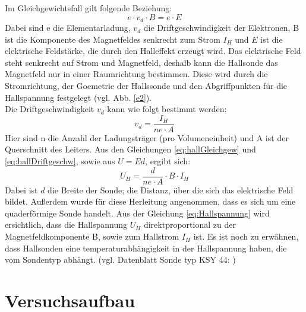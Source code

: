 \documentclass[12pt,a4paper]{article}
\begin{document}
Im Gleichgewichtsfall gilt folgende Beziehung: 
\begin{equation}
	e \cdot v_d\cdot B = e \cdot E
	\label{eq:hallGleichgew}
\end{equation}
Dabei sind e die Elementarladung, $v_d$ die Driftgeschwindigkeit der Elektronen, B ist die Komponente des Magnetfeldes senkrecht zum Strom $I_H$ und $E$ ist die elektrische Feldstärke, die durch den Halleffekt erzeugt wird. Das elektrische Feld steht senkrecht auf Strom und Magnetfeld, deshalb kann die Hallsonde das Magnetfeld nur in einer Raumrichtung bestimmen. Diese wird durch die Stromrichtung, der Goemetrie der Hallssonde und den Abgriffpunkten für die Hallspannung festgelegt (vgl. Abb. \ref{e2}).\\
Die Driftgeschwindigkeit $v_d$ kann  wie folgt bestimmt werden:
\begin{equation} 
	v_d = \frac{I_H}{n e\cdot A}
	\label{eq:hallDriftgeschw}
\end{equation}
Hier sind n die Anzahl der Ladungsträger (pro Volumeneinheit) und A ist der Querschnitt des Leiters. Aus den Gleichungen \ref{eq:hallGleichgew} und \ref{eq:hallDriftgeschw}, sowie aus $U=Ed$, ergibt sich:
\begin{equation}
	U_H = \frac{d}{ne\cdot A} \cdot B \cdot I_H
	\label{eq:Hallspannung}
\end{equation}
Dabei ist $d$ die Breite der Sonde; die Distanz, über die sich das elektrische Feld bildet. Außerdem wurde für diese Herleitung angenommen, dass es sich um eine quaderförmige Sonde handelt. Aus der Gleichung \ref{eq:Hallspannung} wird ersichtlich, dass die Hallspannung $U_H$ direktproportional zu der Magnetfeldkomponente B, sowie zum Hallstrom $I_H$ ist. Es ist noch zu erwähnen, dass Hallsonden eine temperaturabhängigkeit in der Hallspannung haben, die vom Sondentyp abhängt. (vgl. Datenblatt Sonde typ KSY 44: \cite{hall})
\section{Versuchsaufbau}
\end{document}
